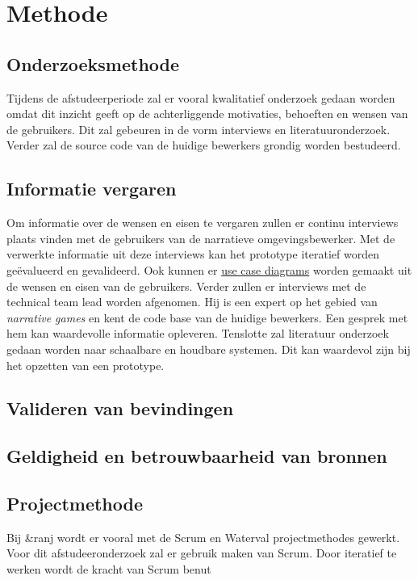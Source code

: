 \documentclass{report}
\newcommand{\organisation}{\&ranj }
\begin{document}
\chapter{Methode}

\section{Onderzoeksmethode}
Tijdens de afstudeerperiode zal er vooral kwalitatief onderzoek gedaan worden omdat dit inzicht geeft op de achterliggende motivaties, behoeften en wensen van de gebruikers. Dit zal gebeuren in de vorm interviews en literatuuronderzoek. Verder zal de source code van de huidige bewerkers grondig worden bestudeerd. 

\section{Informatie vergaren}
Om informatie over de wensen en eisen te vergaren zullen er continu interviews plaats vinden met de gebruikers van de narratieve omgevingsbewerker. Met de verwerkte informatie uit deze interviews kan het prototype iteratief worden ge{\"e}valueerd en gevalideerd. Ook kunnen er \href{http://www.agilemodeling.com/artifacts/useCaseDiagram.htm}{use case diagrams} worden gemaakt uit de wensen en eisen van de gebruikers.
Verder zullen er interviews met de technical team lead worden afgenomen. Hij is een expert op het gebied van \emph{narrative games} en kent de code base van de huidige bewerkers. Een gesprek met hem kan waardevolle informatie opleveren.
Tenslotte zal literatuur onderzoek gedaan worden naar schaalbare en houdbare systemen. Dit kan waardevol zijn bij het opzetten van een prototype.

\section{Valideren van bevindingen}

\section{Geldigheid en betrouwbaarheid van bronnen}

\section{Projectmethode}
Bij \organisation wordt er vooral met de Scrum en Waterval projectmethodes gewerkt. Voor dit afstudeeronderzoek zal er gebruik maken van Scrum. Door iteratief te werken wordt de kracht van Scrum benut
\end{document}
